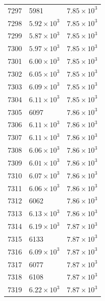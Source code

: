 \begin{table}[H]
\begin{tabular}{lll}
7297 & 5981 & $\displaystyle 7.85 \times 10^{3}$ \\
7298 & $\displaystyle 5.92 \times 10^{3}$ & $\displaystyle 7.85 \times 10^{3}$ \\
7299 & $\displaystyle 5.87 \times 10^{3}$ & $\displaystyle 7.85 \times 10^{3}$ \\
7300 & $\displaystyle 5.97 \times 10^{3}$ & $\displaystyle 7.85 \times 10^{3}$ \\
7301 & $\displaystyle 6.00 \times 10^{3}$ & $\displaystyle 7.85 \times 10^{3}$ \\
7302 & $\displaystyle 6.05 \times 10^{3}$ & $\displaystyle 7.85 \times 10^{3}$ \\
7303 & $\displaystyle 6.09 \times 10^{3}$ & $\displaystyle 7.85 \times 10^{3}$ \\
7304 & $\displaystyle 6.11 \times 10^{3}$ & $\displaystyle 7.85 \times 10^{3}$ \\
7305 & 6097 & $\displaystyle 7.86 \times 10^{3}$ \\
7306 & $\displaystyle 6.11 \times 10^{3}$ & $\displaystyle 7.86 \times 10^{3}$ \\
7307 & $\displaystyle 6.11 \times 10^{3}$ & $\displaystyle 7.86 \times 10^{3}$ \\
7308 & $\displaystyle 6.06 \times 10^{3}$ & $\displaystyle 7.86 \times 10^{3}$ \\
7309 & $\displaystyle 6.01 \times 10^{3}$ & $\displaystyle 7.86 \times 10^{3}$ \\
7310 & $\displaystyle 6.07 \times 10^{3}$ & $\displaystyle 7.86 \times 10^{3}$ \\
7311 & $\displaystyle 6.06 \times 10^{3}$ & $\displaystyle 7.86 \times 10^{3}$ \\
7312 & 6062 & $\displaystyle 7.86 \times 10^{3}$ \\
7313 & $\displaystyle 6.13 \times 10^{3}$ & $\displaystyle 7.86 \times 10^{3}$ \\
7314 & $\displaystyle 6.19 \times 10^{3}$ & $\displaystyle 7.87 \times 10^{3}$ \\
7315 & 6133 & $\displaystyle 7.87 \times 10^{3}$ \\
7316 & $\displaystyle 6.09 \times 10^{3}$ & $\displaystyle 7.87 \times 10^{3}$ \\
7317 & 6077 & $\displaystyle 7.87 \times 10^{3}$ \\
7318 & 6108 & $\displaystyle 7.87 \times 10^{3}$ \\
7319 & $\displaystyle 6.22 \times 10^{3}$ & $\displaystyle 7.87 \times 10^{3}$ \\

\end{tabular}
\end{table}
